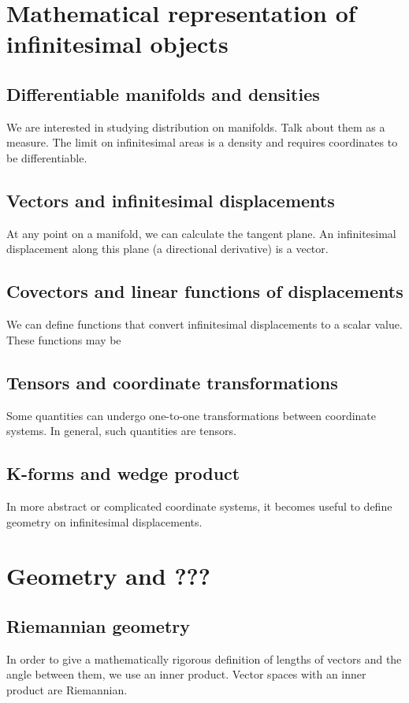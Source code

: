 \documentclass{book}
\begin{document}
\chapter{Mathematical representation of infinitesimal objects}

\section{Differentiable manifolds and densities}
We are interested in studying distribution on manifolds. Talk about them as a measure. The limit on infinitesimal areas is a density and requires coordinates to be differentiable.

\section{Vectors and infinitesimal displacements}
At any point on a manifold, we can calculate the tangent plane. An infinitesimal displacement along this plane (a directional derivative) is a vector. 
\section{Covectors and linear functions of displacements}
We can define functions that convert infinitesimal displacements to a scalar value. These functions may be 
\section{Tensors and coordinate transformations}
Some quantities can undergo one-to-one transformations between coordinate systems. In general, such quantities are tensors. 
\section{K-forms and wedge product}
In more abstract or complicated coordinate systems, it becomes useful to define geometry on infinitesimal displacements. 
\chapter{Geometry and ???}

\section{Riemannian geometry}
In order to give a mathematically rigorous definition of lengths of vectors and the angle between them, we use an inner product. Vector spaces with an inner product are Riemannian. 
\end{document}
